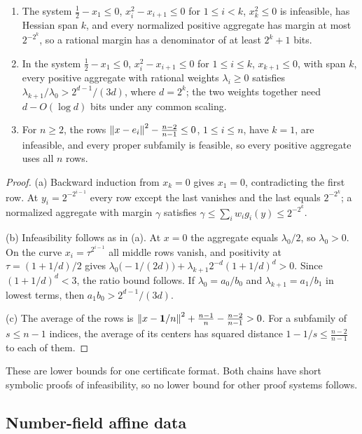 \begin{proposition}
\label{prop:qc-infeasibility-lower}
\begin{enumerate}[label=(\alph*),leftmargin=*]
\item The system $\tfrac12-x_1\le0$, $x_i^2-x_{i+1}\le0$ for $1\le i<k$,
$x_k^2\le0$ is infeasible, has Hessian span $k$, and every normalized
positive aggregate has margin at most $2^{-2^k}$, so a rational margin has a
denominator of at least $2^k+1$ bits.
\item In the system $\tfrac12-x_1\le0$, $x_i^2-x_{i+1}\le0$ for $1\le i\le k$,
$x_{k+1}\le0$, with span $k$, every positive aggregate with rational weights
$\lambda_i\ge0$ satisfies $\lambda_{k+1}/\lambda_0>2^{d-1}/(3d)$, where
$d=2^k$; the two weights together need $d-O(\log d)$ bits under any common
scaling.
\item For $n\ge2$, the rows $\left\lVert x-e_i\right\rVert^2-\frac{n-2}{n-1}\le0$,
$1\le i\le n$, have $k=1$, are infeasible, and every proper subfamily is
feasible, so every positive aggregate uses all $n$ rows.
\end{enumerate}
\end{proposition}

\begin{proof}
(a) Backward induction from $x_k=0$ gives $x_1=0$, contradicting the first
row. At $y_i=2^{-2^{i-1}}$ every row except the last vanishes and the last
equals $2^{-2^k}$; a normalized aggregate with margin $\gamma$ satisfies
$\gamma\le\sum_iw_ig_i(y)\le2^{-2^k}$.

(b) Infeasibility follows as in (a). At $x=0$ the aggregate equals
$\lambda_0/2$, so $\lambda_0>0$. On the curve $x_i=\tau^{2^{i-1}}$ all middle
rows vanish, and positivity at $\tau=(1+1/d)/2$ gives
$\lambda_0\bigl(-1/(2d)\bigr)+\lambda_{k+1}2^{-d}(1+1/d)^d>0$. Since
$(1+1/d)^d<3$, the ratio bound follows. If $\lambda_0=a_0/b_0$ and
$\lambda_{k+1}=a_1/b_1$ in lowest terms, then $a_1b_0>2^{d-1}/(3d)$.

(c) The average of the rows is $\left\lVert x-\mathbf1/n\right\rVert^2+\frac{n-1}n-\frac{n-2}{n-1}
>0$. For a subfamily of $s\le n-1$ indices, the average of its centers has
squared distance $1-1/s\le\frac{n-2}{n-1}$ to each of them.
\end{proof}

These are lower bounds for one certificate format. Both chains have short
symbolic proofs of infeasibility, so no lower bound for other proof systems
follows.

\subsection{Number-field affine data}
\label{app:qc-number-field}

